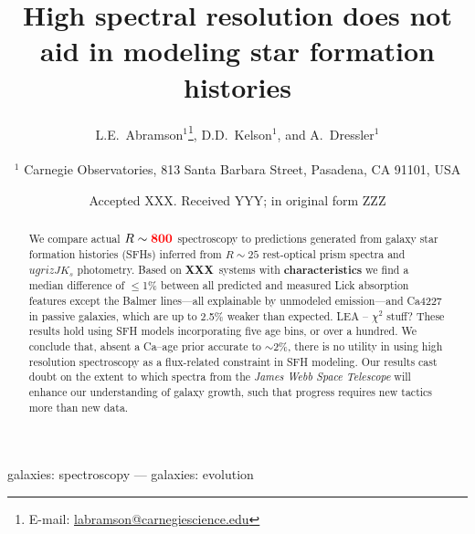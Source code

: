 \documentclass[a4paper,fleqn,usenatbib]{mnras}
\title[More is not better]{High spectral resolution does not aid in 
					modeling star formation histories}
\author[Abramson, Kelson, \& Dressler]{L.E.~Abramson$^{1}$\thanks{E-mail: \href{mailto:labramson@carnegiescience.edu}{labramson@carnegiescience.edu}},
D.D.~Kelson$^{1}$,
and A.~Dressler$^{1}$
\\
\\
$^1$	Carnegie Observatories, 813 Santa Barbara Street, Pasadena, CA 91101, USA\\
}
\date{Accepted XXX. Received YYY; in original form ZZZ}
\newcommand{\Mstel}{M_\ast}
\newcommand{\bfr}{\bf\color{red}}
\newcommand{\bfb}{\color{myblue}}
\newcommand{\ntot}{{\bfr XXX}} %
\begin{document}
\label{firstpage}
\pagerange{\pageref{firstpage}--\pageref{lastpage}}
\maketitle

\begin{abstract}

	We compare actual $R\sim{\bfr 800}$ spectroscopy to predictions generated from galaxy 
	star formation histories (SFHs) inferred from $R\sim25$ rest-optical prism spectra 
	and $ugrizJK_{s}$ photometry. Based on \ntot\ systems with {\bfr characteristics} 
	we find a median difference of 
	$\leq$1\% between all predicted and measured Lick absorption features except the Balmer 
	lines---all explainable by unmodeled emission---and Ca4227 in passive galaxies, 
	which are up to 2.5\% weaker than expected. {\bfb LEA -- $\chi^{2}$ stuff?}
	These results hold using SFH models incorporating five age bins, or over a hundred. 
	We conclude that, absent a Ca--age prior accurate to $\sim$2\%, there is no utility in using 
	high resolution spectroscopy as a flux-related constraint in SFH modeling. 
	Our results cast doubt on the extent to which 
	spectra from the {\it James Webb Space Telescope} will enhance our understanding of 
	galaxy growth, such that progress requires new tactics more than new data.

\end{abstract}

\begin{keywords}
	galaxies: spectroscopy --- galaxies: evolution
\end{keywords}


\end{document}
